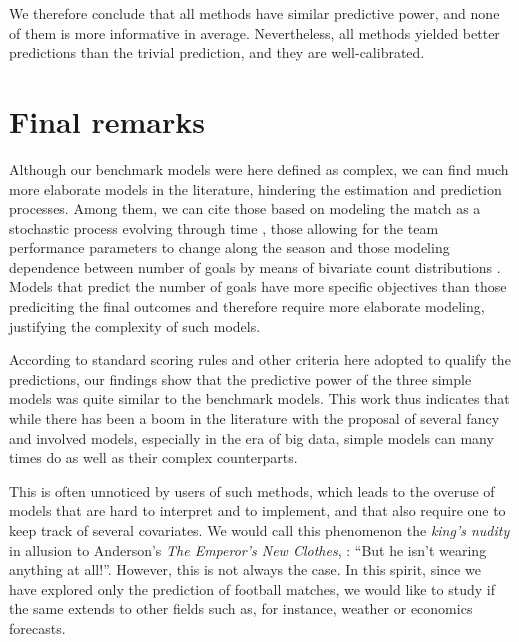 \documentclass[journal,article,accept,moreauthors,pdftex,12pt,a4paper]{mdpi}
\begin{document}
    We therefore conclude that all methods have similar predictive power, and none of them is more informative in average.
    Nevertheless, all methods yielded better predictions than the trivial prediction, and they are well-calibrated.

    \section{Final remarks}
    \label{sec::remarks}

    Although our benchmark models were here defined as complex, we can find much more elaborate models in the literature, hindering the estimation and prediction processes.
    Among them, we can cite those based on modeling the match as a stochastic process evolving through time \citep{Dixon98, Volf2009, Titman2015}, those allowing for the team performance parameters to change along the season \citep{Rue2000, Crowder2002, Owen2011, Koopman2015} and those modeling dependence between number of goals by means of bivariate count distributions \citep{Dixon97, Karlis2003, McHale2007, McHale2011}. Models that predict the number of goals have more specific objectives than those prediciting the final outcomes and therefore require more elaborate modeling, justifying the complexity of such models. 

    According to standard scoring rules and other criteria here adopted to qualify the predictions, our findings show that the predictive power of the three simple models was quite similar to the benchmark models.
    This work thus indicates that while there has been a boom in the literature with the proposal of several fancy and involved models, especially in the era of big data, simple models can many times do
    as well as their complex counterparts.

    This is often unnoticed by users of such methods, which leads to the overuse of models that are
    hard to interpret and to implement, and that also require one to keep track of several covariates. We would call this phenomenon the {\it king's nudity} in allusion to Anderson's {\it The Emperor's New Clothes}, \cite{emperor}: ``But he isn't wearing anything at all!''. However, this is not always the case. In this spirit, since we have explored only the prediction of football matches, we would like to study if the same extends to other fields such as, for instance, weather or economics forecasts.
\end{document}
